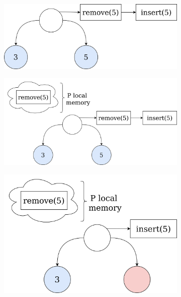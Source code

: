 \documentclass[times, dvipsnames,%
               languages={russian,english} %
              ]{itmo-student-thesis}
\begin{document}
\begin{figure}[H]
     \centering
     \begin{subfigure}[b]{0.45\linewidth}
          \centering
          \includegraphics[width=\linewidth]{pics/create-ts-1.png}
          \label{create-ts-1-pic}
     \end{subfigure}
     \hfill
     \begin{subfigure}[b]{0.45\linewidth}
          \centering
          \includegraphics[width=\linewidth]{pics/create-ts-2.png}
          \label{create-ts-2-pic}
     \end{subfigure}
     \hfill
     \begin{subfigure}[b]{0.45\linewidth}
          \centering
          \includegraphics[width=\linewidth]{pics/create-ts-3.png}

\end{subfigure}
\end{figure}
\end{document}
